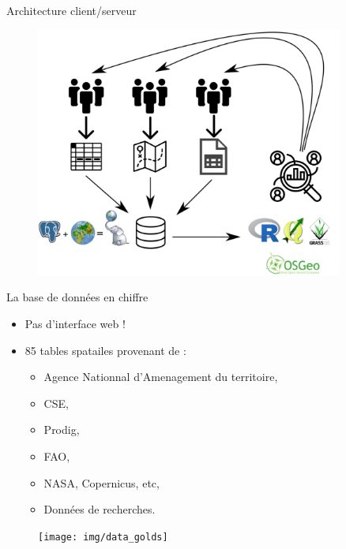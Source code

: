 \documentclass[newPxFont]{beamer}
\begin{document}
\begin{frame}[c]{Architecture client/serveur}
\vspace{-2em}
\begin{figure}
	\centering
	\includegraphics[width = 0.9\textwidth]{img/cooperation}
\end{figure}
\end{frame}

\begin{frame}[fragile]{La base de données en chiffre}
\vspace{-2em}
\begin{itemize}
  \item Pas d'interface web !
  \item 85 tables spatailes provenant de :
    \begin{itemize}
      \item Agence Nationnal d'Amenagement du territoire,
      \item CSE,
      \item Prodig,
      \item FAO,
      \item NASA, Copernicus, etc,
      \item Données de recherches.
    \end{itemize}
\end{itemize}
\begin{figure}
	\centering
	\texttt{[image: img/data\_golds]}
\end{figure}
\end{frame}
\end{document}
